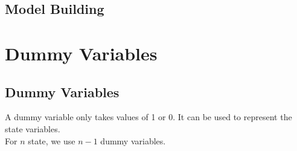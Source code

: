 \documentclass{article}
\begin{document}
\subsection{Model Building}



\newpage
\section{Dummy Variables}
\subsection{Dummy Variables}
A dummy variable only takes values of 1 or 0. It can be used to represent the state variables.\\
For $n$ state, we use $n - 1$ dummy variables.
\end{document}
